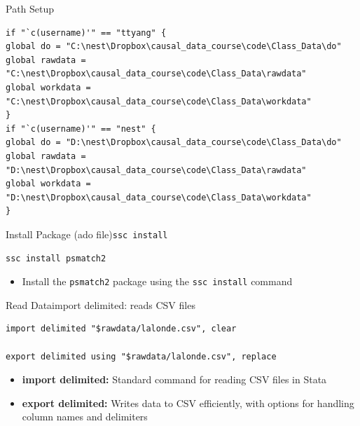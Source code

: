 \documentclass[hyperref={pdfpagelabels=false}]{beamer}
\begin{document}
\begin{frame}[fragile]{Path Setup}{}
\begin{lstlisting}
if "`c(username)'" == "ttyang" {
global do = "C:\nest\Dropbox\causal_data_course\code\Class_Data\do"
global rawdata = "C:\nest\Dropbox\causal_data_course\code\Class_Data\rawdata"
global workdata = "C:\nest\Dropbox\causal_data_course\code\Class_Data\workdata"
}
if "`c(username)'" == "nest" {
global do = "D:\nest\Dropbox\causal_data_course\code\Class_Data\do"
global rawdata = "D:\nest\Dropbox\causal_data_course\code\Class_Data\rawdata"
global workdata = "D:\nest\Dropbox\causal_data_course\code\Class_Data\workdata"
}
\end{lstlisting}
	\begin{itemize}
	
		
		
	\end{itemize}
\end{frame}








\begin{frame}[fragile]{Install Package (ado file)}{\texttt{ssc install}}
\begin{lstlisting}
ssc install psmatch2
\end{lstlisting}
	\begin{itemize}
		\vspace{0.2cm}
        \item Install the \texttt{psmatch2} package using the \texttt{ssc install} command

		
	\end{itemize}
\end{frame}





\begin{frame}[fragile]{Read Data}{import delimited: reads CSV files}
\begin{lstlisting}
import delimited "$rawdata/lalonde.csv", clear

export delimited using "$rawdata/lalonde.csv", replace
\end{lstlisting}
	
	\begin{itemize}
		\vspace{0.2cm}
		\item \textbf{import delimited:} Standard command for reading CSV files in Stata
		\vspace{0.2cm}
		\item \textbf{export delimited:} Writes data to CSV efficiently, with options for handling column names and delimiters
	\end{itemize}
\end{frame}
\end{document}
